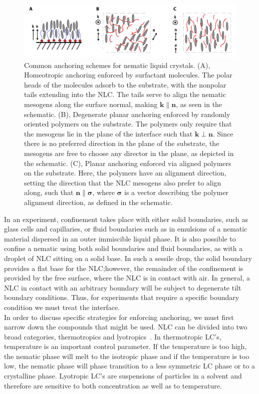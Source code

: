 \begin{figure}[h]
  \centering
  \includegraphics{figures/C2/Ch2-Figs_Anchor.png}
  \caption{Common anchoring schemes for nematic liquid crystals. (A), Homeotropic anchoring enforced by surfactant molecules.
  The polar heads of the molecules adsorb to the substrate, with the nonpolar tails extending into the NLC.
  The tails serve to align the nematic mesogens along the surface normal, making $\mathbf{k} \parallel \mathbf{n}$, as seen in the schematic.
  (B), Degenerate planar anchoring enforced by randomly oriented polymers on the substrate. The polymers only require that the mesogens lie in the plane of the interface such that $\mathbf{k} \perp \mathbf{n}$. Since there is no preferred direction in the plane of the substrate, the mesogens are free to choose any director in the plane, as depicted in the schematic.
  (C), Planar anchoring enforced via aligned polymers on the substrate. Here, the polymers have an alignment direction, setting the direction that the NLC mesogens also prefer to align along, such that $\mathbf{n} \parallel \bm{\sigma}$, where $\bm{\sigma}$ is a vector describing the polymer alignment direction, as defined in the schematic.}\label{f:2-Anchor}
\end{figure}

In an experiment, confinement takes place with either solid boundaries, such as glass cells and capillaries, or fluid boundaries such as in emulsions of a nematic material dispersed in an outer immiscible liquid phase.
It is also possible to confine a nematic using both solid boundaries and fluid boundaries, as with a droplet of NLC sitting on a solid base.
In such a sessile drop, the solid boundary provides a flat base for the NLC;\@ however, the remainder of the confinement is provided by the free surface, where the NLC is in contact with air.
In general, a NLC in contact with an arbitrary boundary will be subject to degenerate tilt boundary conditions.
Thus, for experiments that require a specific boundary condition we must treat the interface.\\

In order to discuss specific strategies for enforcing anchoring, we must first narrow down the compounds that might be used.
NLC can be divided into two broad categories, thermotropics and lyotropics~\cite{RN33}.
In thermotropic LC's, temperature is an important control parameter.
If the temperature is too high, the nematic phase will melt to the isotropic phase and if the temperature is too low, the nematic phase will phase transition to a less symmetric LC phase or to a crystalline phase.
Lyotropic LC's are suspensions of particles in a solvent and therefore are sensitive to both concentration as well as to temperature.

